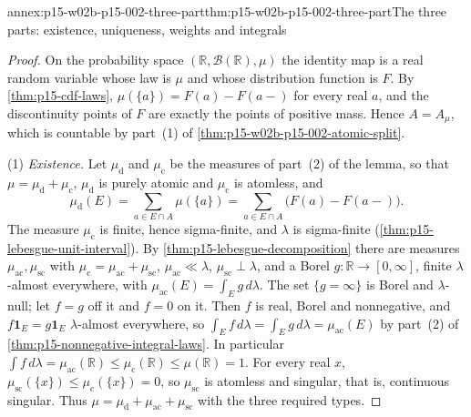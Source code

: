 \begin{annexitem}{annex:p15-w02b-p15-002-three-part}{thm:p15-w02b-p15-002-three-part}{The three parts: existence, uniqueness, weights and integrals}
\begin{proof}
On the probability space \((\mathbb R,\mathcal B(\mathbb R),\mu)\) the
identity map is a real random variable whose law is \(\mu\) and whose
distribution function is \(F\). By \cref{thm:p15-cdf-laws},
\(\mu(\{a\})=F(a)-F(a-)\) for every real \(a\), and the discontinuity
points of \(F\) are exactly the points of positive mass. Hence
\(A=A_\mu\), which is countable by part~(1) of
\cref{thm:p15-w02b-p15-002-atomic-split}.

(1) \emph{Existence.} Let \(\mu_{\mathrm d}\) and \(\mu_{\mathrm c}\)
be the measures of part~(2) of the lemma, so that
\(\mu=\mu_{\mathrm d}+\mu_{\mathrm c}\), \(\mu_{\mathrm d}\) is purely
atomic and \(\mu_{\mathrm c}\) is atomless, and
\[
 \mu_{\mathrm d}(E)=\sum_{a\in E\cap A}\mu(\{a\})
                   =\sum_{a\in E\cap A}\bigl(F(a)-F(a-)\bigr).
\]
The measure \(\mu_{\mathrm c}\) is finite, hence sigma-finite, and
\(\lambda\) is sigma-finite (\cref{thm:p15-lebesgue-unit-interval}). By
\cref{thm:p15-lebesgue-decomposition} there are measures
\(\mu_{\mathrm{ac}},\mu_{\mathrm{sc}}\) with
\(\mu_{\mathrm c}=\mu_{\mathrm{ac}}+\mu_{\mathrm{sc}}\),
\(\mu_{\mathrm{ac}}\ll\lambda\), \(\mu_{\mathrm{sc}}\perp\lambda\), and a
Borel \(g:\mathbb R\to[0,\infty]\), finite \(\lambda\)-almost
everywhere, with \(\mu_{\mathrm{ac}}(E)=\int_Eg\,d\lambda\). The set
\(\{g=\infty\}\) is Borel and \(\lambda\)-null; let \(f=g\) off it and
\(f=0\) on it. Then \(f\) is real, Borel and nonnegative, and
\(f\mathbf1_E=g\mathbf1_E\) \(\lambda\)-almost everywhere, so
\(\int_Ef\,d\lambda=\int_Eg\,d\lambda=\mu_{\mathrm{ac}}(E)\) by part~(2)
of \cref{thm:p15-nonnegative-integral-laws}. In particular
\(\int f\,d\lambda=\mu_{\mathrm{ac}}(\mathbb R)
\leq\mu_{\mathrm c}(\mathbb R)\leq\mu(\mathbb R)=1\). For every real
\(x\), \(\mu_{\mathrm{sc}}(\{x\})\leq\mu_{\mathrm c}(\{x\})=0\), so
\(\mu_{\mathrm{sc}}\) is atomless and singular, that is, continuous
singular. Thus \(\mu=\mu_{\mathrm d}+\mu_{\mathrm{ac}}+\mu_{\mathrm{sc}}\)
with the three required types.


\end{proof}
\end{annexitem}
